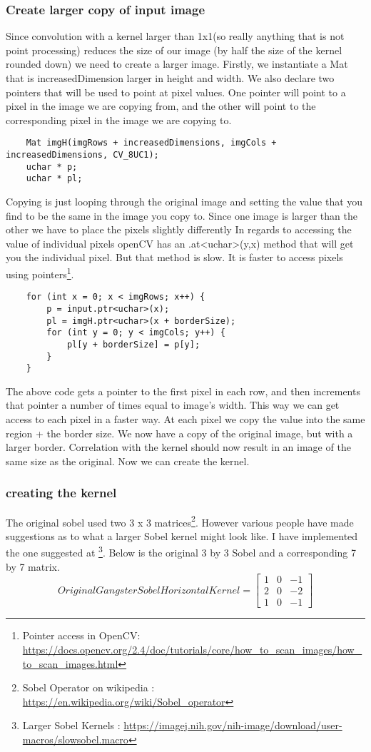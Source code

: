 \documentclass{article}
\begin{document}
\subsubsection{Create larger copy of input image}
Since convolution with a kernel larger than 1x1(so really anything that is not point processing) reduces the size of our image (by half the size of the kernel rounded down) we need to create a larger image.
Firstly, we instantiate a Mat that is increasedDimension larger in height and width. We also declare two pointers that will be used to point at pixel values. One pointer will point to a pixel in the image we are copying from, and the other will point to the corresponding pixel in the image we are copying to.
\begin{lstlisting}
 	Mat imgH(imgRows + increasedDimensions, imgCols + increasedDimensions, CV_8UC1);
 	uchar * p;
 	uchar * pl;
\end{lstlisting}
Copying is just looping through the original image and setting the value that you find to be the same in the image you copy to. Since one image is larger than the other we have to place the pixels slightly differently
In regards to accessing the value of individual pixels openCV has an .at<uchar>(y,x) method that will get you the individual pixel. But that method is slow. It is faster to access pixels using pointers\footnote{Pointer access in OpenCV: \url{https://docs.opencv.org/2.4/doc/tutorials/core/how_to_scan_images/how_to_scan_images.html}}.
\begin{lstlisting}
	for (int x = 0; x < imgRows; x++) {
		p = input.ptr<uchar>(x);
		pl = imgH.ptr<uchar>(x + borderSize);
		for (int y = 0; y < imgCols; y++) {
			pl[y + borderSize] = p[y];
		}
	}
\end{lstlisting}
The above code gets a pointer to the first pixel in each row, and then increments that pointer a number of times equal to image's width. This way we can get access to each pixel in a faster way. At each pixel we copy the value into the same region + the border size.
We now have a copy of the original image, but with a larger border. Correlation with the kernel should now result in an image of the same size as the original. Now we can create the kernel.
\subsubsection{creating the kernel}
The original sobel used two 3 x 3 matrices\footnote{Sobel Operator on wikipedia : \url{https://en.wikipedia.org/wiki/Sobel_operator}}. However various people have made suggestions as to what a larger Sobel kernel might look like. I have implemented the one suggested at \footnote{Larger Sobel Kernels : \url{https://imagej.nih.gov/nih-image/download/user-macros/slowsobel.macro}}. Below is the original 3 by 3 Sobel and a corresponding 7 by 7 matrix.
\[
OriginalGangsterSobelHorizontalKernel=
\begin{bmatrix}
1 & 0 & -1 \\
2 & 0 & -2 \\
1 & 0 & -1 
\end{bmatrix}
\]
\end{document}
